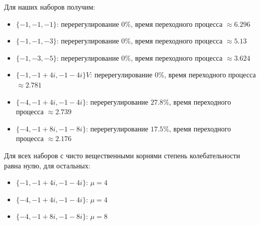 Для наших наборов получим:

\begin{itemize}
\setlength{\itemsep}{-1ex}
   \item{\begin{flushleft} $\lbrace -1,-1,-1\rbrace$: перерегулирование $0\%$, время переходного процесса $\approx 6.296$ \end{flushleft}}
   \item{\begin{flushleft} $\lbrace -1,-1,-3\rbrace$: перерегулирование $0\%$, время переходного процесса $\approx 5.13$ \end{flushleft}}
   \item{\begin{flushleft} $\lbrace -1,-3,-5\rbrace$: перерегулирование $0\%$, время переходного процесса $\approx 3.624$ \end{flushleft}}
   \item{\begin{flushleft} $\lbrace -1,-1+4i,-1-4i\rbrace V$: перерегулирование $0\%$, время переходного процесса $\approx 2.781$ \end{flushleft}}
   \item{\begin{flushleft} $\lbrace -4,-1+4i,-1-4i\rbrace$: перерегулирование $27.8\%$, время переходного процесса $\approx 2.739$ \end{flushleft}}
   \item{\begin{flushleft} $\lbrace -4,-1+8i,-1-8i\rbrace$: перерегулирование $17.5\%$, время переходного процесса $\approx 2.176$ \end{flushleft}}
\end{itemize}


Для всех наборов с чисто вещественными корнями степень колебательности равна нулю, для остальных:


\begin{itemize}
\setlength{\itemsep}{-1ex}
   \item{\begin{flushleft} $\lbrace -1,-1+4i,-1-4i\rbrace$: $\mu =4$ \end{flushleft}}
   \item{\begin{flushleft} $\lbrace -4,-1+4i,-1-4i\rbrace$: $\mu =4$ \end{flushleft}}
   \item{\begin{flushleft} $\lbrace -4,-1+8i,-1-8i\rbrace$: $\mu =8$ \end{flushleft}}
\end{itemize}


